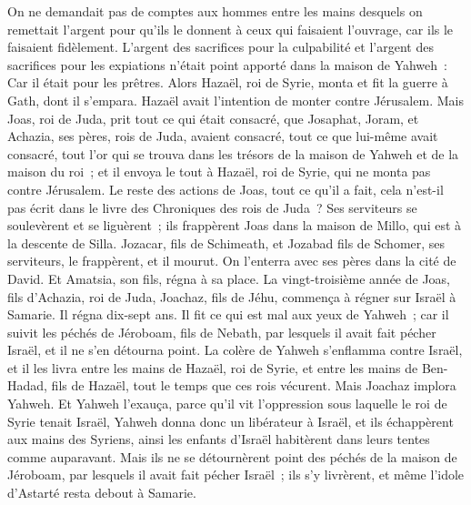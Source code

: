 \begin{multicols}{2}
On ne demandait pas de comptes aux hommes entre les mains desquels on remettait l'argent pour qu'ils le donnent à ceux qui faisaient l'ouvrage, car ils le faisaient fidèlement.
L'argent des sacrifices pour la culpabilité et l'argent des sacrifices pour les expiations n'était point apporté dans la maison de Yahweh~: Car il était pour les prêtres.
Alors Hazaël, roi de Syrie, monta et fit la guerre à Gath, dont il s'empara. Hazaël avait l'intention de monter contre Jérusalem.
Mais Joas, roi de Juda, prit tout ce qui était consacré, que Josaphat, Joram, et Achazia, ses pères, rois de Juda, avaient consacré, tout ce que lui-même avait consacré, tout l'or qui se trouva dans les trésors de la maison de Yahweh et de la maison du roi~; et il envoya le tout à Hazaël, roi de Syrie, qui ne monta pas contre Jérusalem.
Le reste des actions de Joas, tout ce qu'il a fait, cela n'est-il pas écrit dans le livre des Chroniques des rois de Juda~?
Ses serviteurs se soulevèrent et se liguèrent~; ils frappèrent Joas dans la maison de Millo, qui est à la descente de Silla.
Jozacar, fils de Schimeath, et Jozabad fils de Schomer, ses serviteurs, le frappèrent, et il mourut. On l'enterra avec ses pères dans la cité de David. Et Amatsia, son fils, régna à sa place.
\VerseOne{}La vingt-troisième année de Joas, fils d'Achazia, roi de Juda, Joachaz, fils de Jéhu, commença à régner sur Israël à Samarie. Il régna dix-sept ans.
Il fit ce qui est mal aux yeux de Yahweh~; car il suivit les péchés de Jéroboam, fils de Nebath, par lesquels il avait fait pécher Israël, et il ne s'en détourna point.
La colère de Yahweh s'enflamma contre Israël, et il les livra entre les mains de Hazaël, roi de Syrie, et entre les mains de Ben-Hadad, fils de Hazaël, tout le temps que ces rois vécurent.
Mais Joachaz implora Yahweh. Et Yahweh l'exauça, parce qu'il vit l'oppression sous laquelle le roi de Syrie tenait Israël,
Yahweh donna donc un libérateur à Israël, et ils échappèrent aux mains des Syriens, ainsi les enfants d'Israël habitèrent dans leurs tentes comme auparavant.
Mais ils ne se détournèrent point des péchés de la maison de Jéroboam, par lesquels il avait fait pécher Israël~; ils s'y livrèrent, et même l'idole d'Astarté resta debout à Samarie.

\end{multicols}
